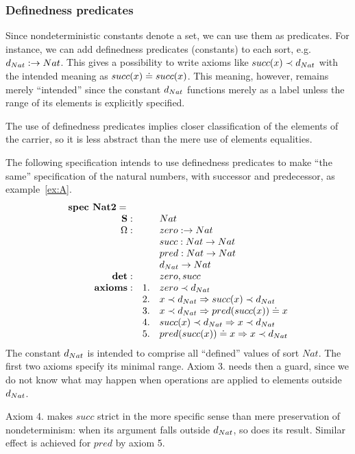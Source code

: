 \documentclass[10pt]{article}
\begin{document}
\subsubsection{Definedness predicates}\label{subsub:dp}
Since  nondeterministic constants denote a set, we  can use them as
predicates. For instance, we can  add definedness 
predicates (constants) to each sort, e.g. $d_{Nat}:\to Nat$. 
This gives a possibility to write axioms like
$succ(x) \prec d_{Nat}$ with the intended meaning as $succ(x) \mathrel{\dot{=} }
succ(x)$. This meaning, however,  remains merely ``intended'' since the
constant $d_{Nat}$  functions merely as a label unless the range of its
elements is explicitly specified.

The use of definedness predicates implies closer classification of the
elements of the carrier,  so it is less abstract than the mere use of
elements equalities.


\begin{example}\label{ex:AB}
The following specification intends to use definedness predicates to make ``the same''
specification of the natural numbers, with successor and predecessor, as
example~\ref{ex:A}.
 \[ \begin{array}{r@{\hspace*{1em}}llll}
 \mbox{\bf spec\ Nat2} =\ \ \\
	\Sorts:	
		&& Nat \\			
	\Ops: 	
		&& zero: \to Nat\\
		&& succ: Nat \to Nat\\
		&& pred: Nat \to Nat\\	
		&& \ok{Nat} \to Nat\\
	{\bf det}:
		&& zero, succ \\
	{\bf axioms}:
		&1.& zero \prec \ok{Nat}\\
		&2.& x\prec \ok{Nat} \To succ(x) \prec \ok{Nat} \\
		&3.& x \prec \ok{Nat} \To  pred(succ(x)) \eleq  x\\
		&4.& succ(x) \prec \ok{Nat} \To x \prec \ok{Nat} \\
		&5.& pred(succ(x)) \eleq  x \To x \prec \ok{Nat} 
\end{array} \] 
The constant $d_{Nat}$ is intended to comprise all ``defined'' values of
sort $Nat$. The first two axioms specify its minimal range. Axiom 3. needs
then a guard, since we do not know what may happen when operations are
applied to elements outside $d_{Nat}$.

Axiom 4. makes $succ$ strict in the more specific sense than mere
preservation of nondeterminism: when its argument
falls outside $d_{Nat}$, so does its result. Similar effect is achieved for
$pred$ by axiom 5.
\end{example}
\end{document}
